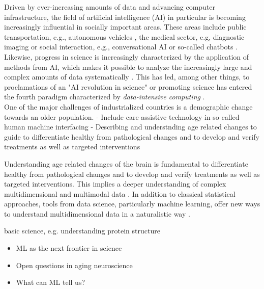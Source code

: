 Driven by ever-increasing amounts of data and advancing computer infrastructure, the field of artificial intelligence (AI) in particular is becoming increasingly influential in socially important areas. These areas include public transportation, e.g., autonomous vehicles \cite{Leonard2020}, the medical sector, e.g, diagnostic imaging \cite{Liu2020} or social interaction, e.g., conversational AI or so-called chatbots \cite{Adamopoulou2020}. Likewise, progress in science is increasingly characterized by the application of methods from AI, which makes it possible to analyze the increasingly large and complex amounts of data systematically \cite{Brunton2019}. This has led, among other things, to proclamations of an "AI revolution in science" \cite{Appenzeller2017} or promoting science has entered the fourth paradigm characterized by \textit{data-intensive computing} \cite{Hastie2009}.\\
One of the major challenges of industrialized countries is a demographic change towards an older population. 
- Include care assistive technology in so called human machine interfacing 
- Describing and understnding age related changes to guide to differentiate healthy from pathological changes and to develop and verify treatments as well as targeted interventions

Understanding age related changes of the brain is fundamental to differentiate healthy from pathological changes and to develop and verify treatments as well as targeted interventions. This implies a deeper understanding of complex multidimensional and multimodal data \cite{Brunton2019}. In addition to classical statistical approaches, tools from data science, particularly machine learning, offer new ways to understand multidimensional data in a naturalistic way \cite{Breiman2001}. 

basic science, e.g. understanding protein structure \cite{Jumper2021}
\begin{itemize}
    \item ML as the next frontier in science \
    \item Open questions in aging neuroscience 
    \item What can ML tell us? 
\end{itemize}


